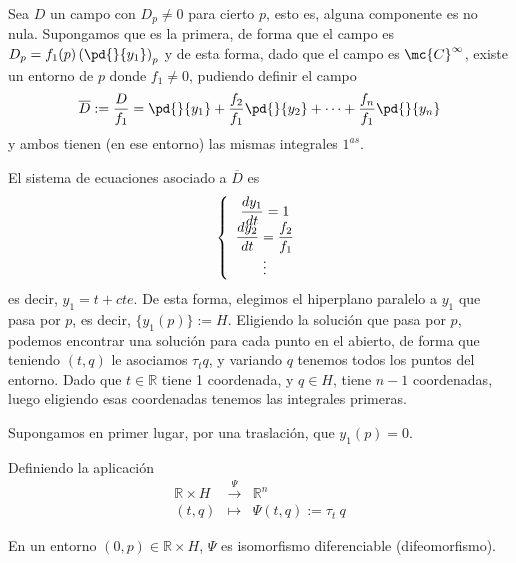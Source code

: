     \begin{teo}
        Sea $D$ un campo con $D_p \neq 0$ para cierto $p$, esto es, alguna componente es no nula. Supongamos que es la primera, de forma que el campo es
        $D_p=f_1(p)\left( \pd{}{y_1}\right)_p$ y de esta forma, dado que el campo es $\mc{C}^{\infty}$, existe un entorno de $p$ donde $f_1\neq 0$, pudiendo definir el campo
        $$\overline{D}:=\dfrac{D}{f_1}=\pd{}{y_1}+\dfrac{f_2}{f_1}\pd{}{y_2}+\cdots + \dfrac{f_n}{f_1} \pd{}{y_n}$$
        y ambos tienen (en ese entorno) las mismas integrales $1^{as}$.

        El sistema de ecuaciones asociado a $\overline{D}$ es 
        $$\left\{ \begin{array}{cc}
             \dfrac{dy_1}{dt}=1  \\
             \vspace{-5mm} \\
             \dfrac{dy_2}{dt}=\dfrac{f_2}{f_1} \\ 
             \vdots
        \end{array} \right.$$
        es decir, $y_1=t+cte.$ De esta forma, elegimos el hiperplano paralelo a $y_1$ que pasa por $p$, es decir, $\{y_1(p)\}:=H$. Eligiendo la solución que pasa por $p$, podemos encontrar una solución para cada punto en el abierto, de forma que teniendo $(t,q)$ le asociamos $\tau_t q$, y variando $q$ tenemos todos los puntos del entorno. Dado que $t \in \mathbb R$ tiene 1 coordenada, y $q \in H$, tiene $n-1$ coordenadas, luego eligiendo esas coordenadas tenemos las integrales primeras.
    \end{teo}
    \begin{lem} Supongamos en primer lugar, por una traslación, que $y_1(p)=0$.
    
        Definiendo la aplicación
        $$\begin{array}{rcl}
            \mathbb R \times H  & \overset{\Psi}{\longrightarrow} & \mathbb R^n  \\
             (t,q) & \longmapsto & \Psi(t,q):=\tau_t \: q
        \end{array}$$
        
        En un entorno $(0,p) \in \mathbb R \times H$, $\Psi$ es isomorfismo diferenciable (difeomorfismo).
    \end{lem}
